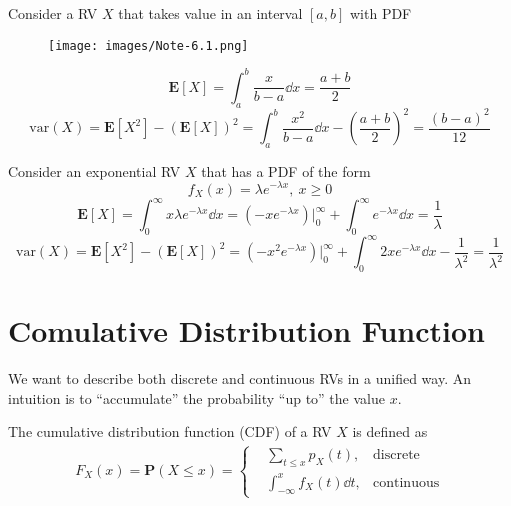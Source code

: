 \begin{example}[Uniform RV]
    Consider a RV $X$ that takes value in an interval $[a, b]$ with PDF
    \begin{figure}[H]
        \centering
        \texttt{[image: images/Note-6.1.png]}
    \end{figure}
    \vspace{-2em}
    \begin{equation}
        \mathbf{E}[X] = \int_{a}^{b} \frac{x}{b - a} \dd{x} = \frac{a + b}{2}
    \end{equation}
    \begin{equation}
        \text{var}(X) = \mathbf{E}[X^2] - (\mathbf{E}[X])^2 = \int_{a}^{b} \frac{x^2}{b - a} \dd{x} - \left(\frac{a + b}{2}\right)^2 = \frac{(b - a)^2}{12}
    \end{equation}
\end{example}

\begin{example}[Exponential RV]
    Consider an exponential RV $X$ that has a PDF of the form
    \begin{equation}
        f_{X}(x) = \lambda e^{-\lambda x},~ x \geq 0
    \end{equation}
    \begin{equation}
        \mathbf{E}[X] = \int_{0}^{\infty} x \lambda e^{-\lambda x} \dd{x} = (-x e^{-\lambda x}) \Big|_{0}^{\infty} + \int_{0}^{\infty} e^{-\lambda x} \dd{x} = \frac{1}{\lambda}
    \end{equation}
    \begin{equation}
        \text{var}(X) = \mathbf{E}[X^2] - (\mathbf{E}[X])^2 = (-x^2 e^{-\lambda x}) \Big|_{0}^{\infty} + \int_{0}^{\infty} 2x e^{-\lambda x} \dd{x} - \frac{1}{\lambda^2} = \frac{1}{\lambda^2}
    \end{equation}
\end{example}


\section{Comulative Distribution Function}
We want to describe both discrete and continuous RVs in a unified way. An intuition is to ``accumulate'' the probability ``up to'' the value $x$.

\begin{definition}[CDF]
    The cumulative distribution function (CDF) of a RV $X$ is defined as
    \begin{align}
        F_{X}(x) = \mathbf{P}(X \leq x) = \left\{
        \begin{aligned}
            &\sum_{t \leq x} p_{X}(t), &\text{discrete} \\ 
            &\int_{-\infty}^{x} f_{X}(t) \dd{t}, &\text{continuous}
        \end{aligned}
        \right.
    \end{align}
\end{definition}

